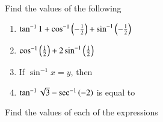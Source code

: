 Find the values of the following
\begin{enumerate}[label=\thesubsection.\arabic*,ref=\thesubsection.\theenumi,resume*,itemsep=1ex]
	\item $\tan^{-1}1+\cos^{-1}\left(-\frac{1}{2}\right)+\sin^{-1}\left(-\frac{1}{2}\right)$
	\item $\cos^{-1}\left(\frac{1}{2}\right)+2\sin^{-1}\left(\frac{1}{2}\right)$
	\item If $\sin^{-1}x = y$, then
\begin{enumerate}
\end{enumerate}
	\item $\tan^{-1}\sqrt{3}-\sec^{-1}\left(-{2}\right)$ is equal to
\begin{enumerate}
\end{enumerate}
\end{enumerate}
Find the values of each of the expressions
